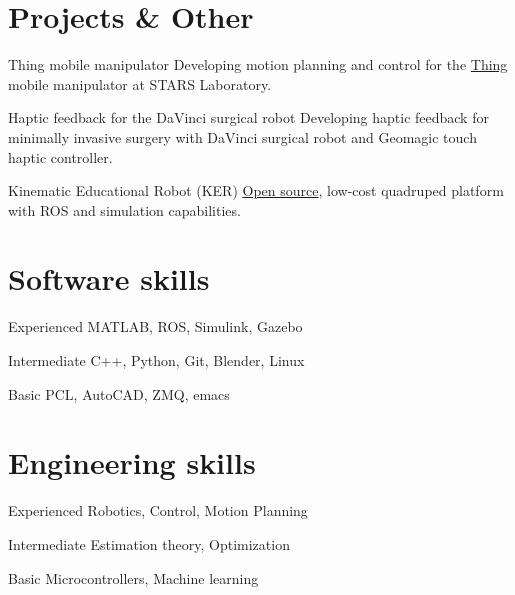 \documentclass{tccv}
\begin{document}
\section{Projects \& Other}
\begin{yearlist2}
\item{}
     {\small Thing mobile manipulator}
     {{\small Developing motion planning and control for the \href{https://youtu.be/l_MliB_B_UQ}{Thing} mobile manipulator at STARS Laboratory.}}
     
\item{}
     {\small Haptic feedback for the DaVinci surgical robot} 
     {{\small Developing haptic feedback for minimally invasive surgery with DaVinci surgical robot and Geomagic touch haptic controller.}}

     \item{}
     {\small Kinematic Educational Robot (KER)}
     {{\small \href{https://github.com/filipmrc/ker}{Open source}, low-cost quadruped platform with ROS and simulation capabilities.}}
\end{yearlist2}
\vspace*{-0.5cm}
%
\section{Software skills}
\begin{factlist}

\item{Experienced}
     {MATLAB, ROS, Simulink, Gazebo}

\item{Intermediate}
     {C++, Python, Git, Blender, Linux} %

\item{Basic}
     {PCL, AutoCAD, ZMQ, emacs}
\end{factlist}
\vspace*{-0.5cm} 
%
\section{Engineering skills}
\begin{factlist}
\item{Experienced}
	 {Robotics, Control, Motion Planning}
	 
\item{Intermediate}
     {Estimation theory, Optimization}
    
\item{Basic}
     {Microcontrollers, Machine learning} 
\end{factlist}
\vspace*{-0.5cm}
%
\end{document}
